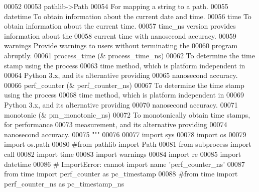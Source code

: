 \begin{DoxyCode}
00052 \textcolor{stringliteral}{}
00053 \textcolor{stringliteral}{    pathlib->Path}
00054 \textcolor{stringliteral}{                For mapping a string to a path.}
00055 \textcolor{stringliteral}{    datetime    To obtain information about the current date and time.}
00056 \textcolor{stringliteral}{    time        To obtain information about the current time.}
00057 \textcolor{stringliteral}{                time\_ns version provides information about the}
00058 \textcolor{stringliteral}{                    current time with nanosecond accuracy.}
00059 \textcolor{stringliteral}{    warnings    Provide warnings to users without terminating the}
00060 \textcolor{stringliteral}{                    program abruptly.}
00061 \textcolor{stringliteral}{    process\_time (& process\_time\_ns)}
00062 \textcolor{stringliteral}{                To determine the time stamp using the process}
00063 \textcolor{stringliteral}{                    time method, which is platform independent in}
00064 \textcolor{stringliteral}{                    Python 3.x, and its alternative providing}
00065 \textcolor{stringliteral}{                    nanosecond accuracy.}
00066 \textcolor{stringliteral}{    perf\_counter (& perf\_counter\_ns)}
00067 \textcolor{stringliteral}{                To determine the time stamp using the process}
00068 \textcolor{stringliteral}{                    time method, which is platform independent in}
00069 \textcolor{stringliteral}{                    Python 3.x, and its alternative providing}
00070 \textcolor{stringliteral}{                    nanosecond accuracy.}
00071 \textcolor{stringliteral}{    monotonic (& pm\_monotonic\_ns)}
00072 \textcolor{stringliteral}{                To monotonically obtain time stamps, for performance}
00073 \textcolor{stringliteral}{                    measurement, and its alternative providing}
00074 \textcolor{stringliteral}{                    nanosecond accuracy.}
00075 \textcolor{stringliteral}{"""}
00076 
00077 \textcolor{keyword}{import} sys
00078 \textcolor{keyword}{import} os
00079 \textcolor{keyword}{import} os.path
00080 \textcolor{comment}{#from pathlib import Path}
00081 \textcolor{keyword}{from} subprocess \textcolor{keyword}{import} call
00082 \textcolor{keyword}{import} time
00083 \textcolor{keyword}{import} warnings
00084 \textcolor{keyword}{import} re
00085 \textcolor{keyword}{import} datetime
00086 \textcolor{comment}{# ImportError: cannot import name 'perf\_counter\_ns'}
00087 \textcolor{keyword}{from} time \textcolor{keyword}{import} perf\_counter \textcolor{keyword}{as} pc\_timestamp
00088 \textcolor{comment}{#from time import perf\_counter\_ns as pc\_timestamp\_ns}

\end{DoxyCode}
